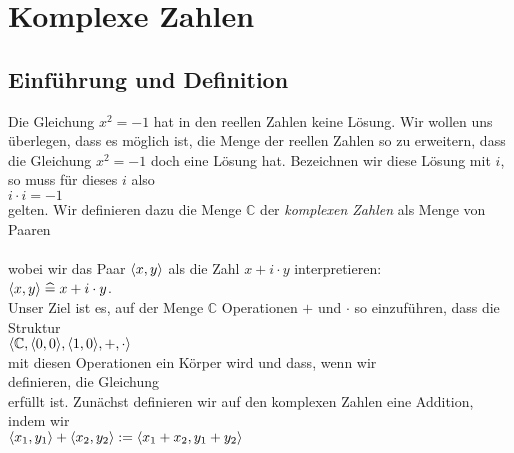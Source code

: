 \chapter{Komplexe Zahlen}

\section{Einf\"{u}hrung und Definition}
Die Gleichung $x^2 = -1$ hat in den reellen Zahlen keine L\"{o}sung.  Wir wollen uns \"{u}berlegen,
dass es m\"{o}glich ist, die Menge der reellen Zahlen so zu erweitern, dass die
Gleichung $x^2 = -1$ doch eine L\"{o}sung hat.  Bezeichnen wir diese L\"{o}sung mit $i$, so muss
f\"{u}r dieses $i$ also
\\[0.2cm]
\hspace*{1.3cm}
$i \cdot i = -1$
\\[0.2cm]
gelten.  Wir definieren dazu die Menge $\mathbb{C}$ der \emph{komplexen Zahlen} als Menge
von Paaren
\\[0.2cm]
\hspace*{1.3cm}
\colorbox{red}{}
\\[0.2cm]
wobei wir das Paar $\pair(x,y)$ als die Zahl $x + i \cdot y$ interpretieren:
\\[0.2cm]
\hspace*{1.3cm}
$\pair(x,y) \;\widehat{=}\; x + i \cdot y$.
\\[0.2cm]
Unser Ziel ist es, auf der Menge $\mathbb{C}$ Operationen $+$ und $\cdot$ so einzuf\"{u}hren, dass
die Struktur
\\[0.2cm]
\hspace*{1.3cm}
$\langle \mathbb{C}, \pair(0,0), \pair(1,0), +, \cdot \rangle$
\\[0.2cm]
mit diesen Operationen ein K\"{o}rper wird und dass, wenn wir 
\\[0.2cm]
\hspace*{1.3cm}
\colorbox{red}{} 
\quad definieren, die Gleichung \quad
\colorbox{red}{}
\\[0.2cm]
erf\"{u}llt ist.  
Zun\"{a}chst definieren wir auf den komplexen Zahlen eine Addition, indem wir 
\\[0.2cm]
\hspace*{1.3cm}
$\pair(x_1,y_1) + \pair(x_2, y_2) := \pair(x_1 + x_2, y_1 + y_2)$
